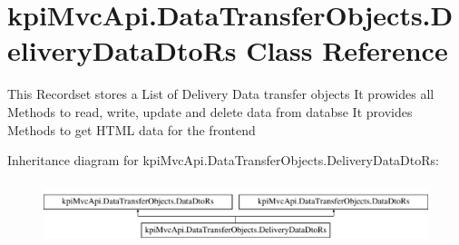 \hypertarget{classkpi_mvc_api_1_1_data_transfer_objects_1_1_delivery_data_dto_rs}{}\section{kpi\+Mvc\+Api.\+Data\+Transfer\+Objects.\+Delivery\+Data\+Dto\+Rs Class Reference}
\label{classkpi_mvc_api_1_1_data_transfer_objects_1_1_delivery_data_dto_rs}


This Recordset stores a List of Delivery Data transfer objects It prowides all Methods to read, write, update and delete data from databse It provides Methods to get H\+T\+ML data for the frontend  


Inheritance diagram for kpi\+Mvc\+Api.\+Data\+Transfer\+Objects.\+Delivery\+Data\+Dto\+Rs\+:\begin{figure}[H]
\begin{center}
\leavevmode
\includegraphics[height=1.794872cm]{classkpi_mvc_api_1_1_data_transfer_objects_1_1_delivery_data_dto_rs}
\end{center}
\end{figure}
